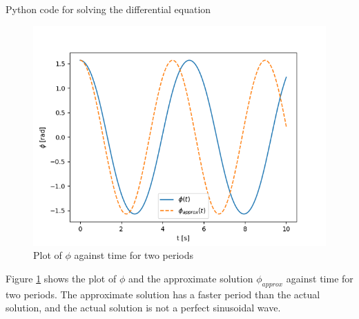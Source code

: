 \documentclass[../problems.tex]{subfiles}
\begin{document}
Python code for solving the differential equation



\begin{figure} [ht]
    \centering 
    \includegraphics[scale=0.5]{fig1_51.png}
    \caption{Plot of $\phi$ against time for two periods}
    \label{fig1.8}
\end{figure}

Figure \ref{fig1.8} shows the plot of $\phi$ and the approximate solution $\phi_{approx}$ against 
time for two periods. The approximate solution has a faster period than the actual solution, and the
actual solution is not a perfect sinusoidal wave.
\end{document}
